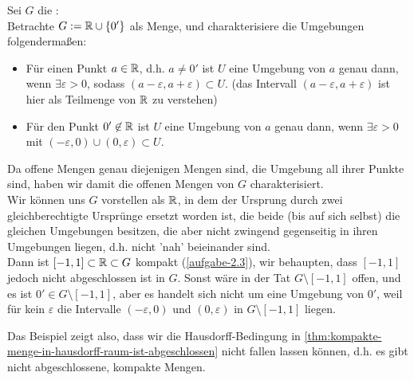 \begin{example}
    Sei $G$ die : \\
    Betrachte $G:=\mathbb{R} \cup  \left \{0'\right\} $ als Menge, und charakterisiere die Umgebungen folgendermaßen:
    \begin{itemize}
        \item Für einen Punkt $a\in \mathbb{R}$, d.h. $a\neq 0'$ ist $U$ eine Umgebung von  $a$ genau dann, wenn  $\exists ε>0$, sodass $(a-ε,a+ε)\subset U$. (das Intervall $(a-ε,a+ε)$ ist hier als Teilmenge von  $\mathbb{R}$ zu verstehen)
        \item Für den Punkt $0'\not\in \mathbb{R}$ ist $U$ eine Umgebung von $a$ genau dann, wenn  $\exists ε>0$ mit $(-ε,0) \cup (0,ε)\subset U$.
    \end{itemize}
    Da offene Mengen genau diejenigen Mengen sind, die Umgebung all ihrer Punkte sind, haben wir damit die offenen Mengen von $G$ charakterisiert. \\
    Wir können uns $G$ vorstellen als  $\mathbb{R}$, in dem der Ursprung durch zwei gleichberechtigte Ursprünge ersetzt worden ist, die beide (bis auf sich selbst) die gleichen Umgebungen besitzen, die aber nicht zwingend gegenseitig in ihren Umgebungen liegen, d.h. nicht 'nah' beieinander sind. \\
    Dann ist $[-1,1]\subset \mathbb{R}\subset G$ kompakt (\autoref{aufgabe-2.3}), wir behaupten, dass $[-1,1]$ jedoch nicht abgeschlossen ist in  $G$. Sonst wäre in der Tat  $G \setminus [-1,1]$ offen, und es ist $0' \in G\setminus [-1,1]$, aber es handelt sich nicht um eine Umgebung von $0'$, weil für kein  $ε$ die Intervalle  $(-ε,0)$ und  $(0,ε)$ in  $G\setminus [-1,1]$ liegen. \\
\end{example}
\begin{dremark}
    Das Beispiel zeigt also, dass wir die Hausdorff-Bedingung in \autoref{thm:kompakte-menge-in-hausdorff-raum-ist-abgeschlossen} nicht fallen lassen können, d.h. es gibt nicht abgeschlossene, kompakte Mengen.
\end{dremark}

